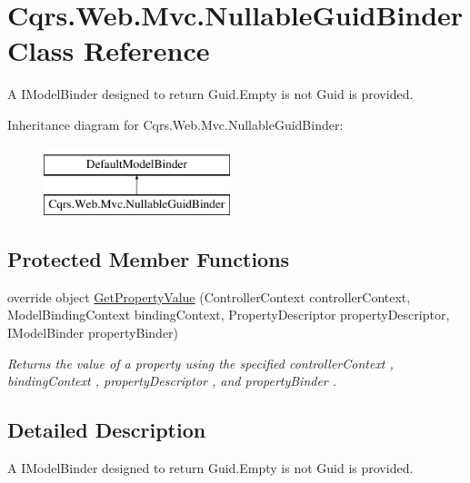 \hypertarget{classCqrs_1_1Web_1_1Mvc_1_1NullableGuidBinder}{}\section{Cqrs.\+Web.\+Mvc.\+Nullable\+Guid\+Binder Class Reference}
\label{classCqrs_1_1Web_1_1Mvc_1_1NullableGuidBinder}


A I\+Model\+Binder designed to return Guid.\+Empty is not Guid is provided.  


Inheritance diagram for Cqrs.\+Web.\+Mvc.\+Nullable\+Guid\+Binder\+:\begin{figure}[H]
\begin{center}
\leavevmode
\includegraphics[height=2.000000cm]{classCqrs_1_1Web_1_1Mvc_1_1NullableGuidBinder}
\end{center}
\end{figure}
\subsection*{Protected Member Functions}
\begin{DoxyCompactItemize}
\item 
override object \hyperlink{classCqrs_1_1Web_1_1Mvc_1_1NullableGuidBinder_ab6dc97f55bdf6a968449f365a807da0a_ab6dc97f55bdf6a968449f365a807da0a}{Get\+Property\+Value} (Controller\+Context controller\+Context, Model\+Binding\+Context binding\+Context, Property\+Descriptor property\+Descriptor, I\+Model\+Binder property\+Binder)
\begin{DoxyCompactList}\small\item\em Returns the value of a property using the specified {\itshape controller\+Context} , {\itshape binding\+Context} , {\itshape property\+Descriptor} , and {\itshape property\+Binder} . \end{DoxyCompactList}\end{DoxyCompactItemize}


\subsection{Detailed Description}
A I\+Model\+Binder designed to return Guid.\+Empty is not Guid is provided. 



